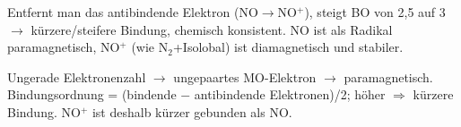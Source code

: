 \begin{kontrolle}
Entfernt man das antibindende Elektron (NO$\rightarrow$NO$^+$), steigt BO
von 2{,}5 auf 3 $\rightarrow$ kürzere/steifere Bindung, chemisch
konsistent. NO ist als Radikal paramagnetisch, NO$^+$ (wie N$_2$+Isolobal)
ist diamagnetisch und stabiler.
\end{kontrolle}

\begin{merksatz}
Ungerade Elektronenzahl $\rightarrow$ ungepaartes MO-Elektron
$\rightarrow$ paramagnetisch. Bindungsordnung = (bindende $-$ antibindende
Elektronen)/2; h\"oher $\Rightarrow$ kürzere Bindung. NO$^+$ ist deshalb
kürzer gebunden als NO.
\end{merksatz}
